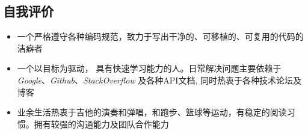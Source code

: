 \documentclass[UTF8, 12pt, a4paper,sans]{moderncv}       %
\begin{document}
    \subsection{自我评价}

    \begin{itemize}
        \item{\medium 一个严格遵守各种编码规范，致力于写出干净的、可移植的、可复用的代码的洁癖者}
        \item{\medium 一个以目标为驱动， 具有快速学习能力的人。日常解决问题主要依赖于\textit{Google}、\textit{Github}、\textit{StackOverflow} 及各种API文档, 同时热衷于各种技术论坛及博客}
        \item{\medium 业余生活热衷于吉他的演奏和弹唱，和跑步、篮球等运动，有稳定的阅读习惯。拥有较强的沟通能力及团队合作能力}
    \end{itemize}
\end{document}

